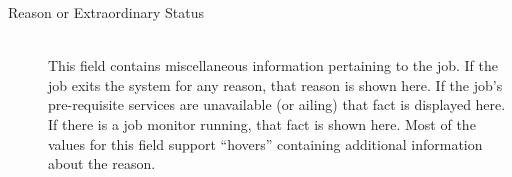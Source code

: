 \begin{description}
            \item[Reason or Extraordinary Status] \hfill \\

              
              This field contains miscellaneous information pertaining to the job.  If the job exits
              the system for any reason, that reason is shown here.  If the job's pre-requisite
              services are unavailable (or ailing) that fact is displayed here.  If there is a
              job monitor running, that fact is shown here.  Most of the values for this field
              support ``hovers'' containing additional information about the reason.
         

\end{description}
